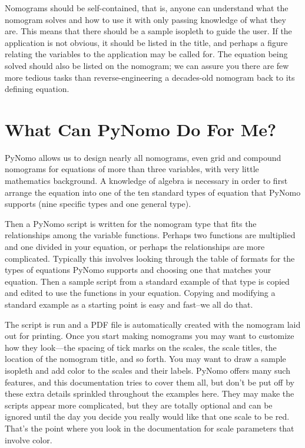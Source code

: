 \documentclass[a4paper,11pt,english]{sphinxmanual}
\begin{document}
Nomograms should be self-contained, that is, anyone can understand what the nomogram solves and how to use it with only passing knowledge of what they are. This means that there should be a sample isopleth to guide the user. If the application is not obvious, it should be listed in the title, and perhaps a figure relating the variables to the application may be called for. The equation being solved should also be listed on the nomogram; we can assure you there are few more tedious tasks than reverse-engineering a decades-old nomogram back to its defining equation.


\section{What Can PyNomo Do For Me?}
\label{introduction/introduction:what-can-pynomo-do-for-me}
PyNomo allows us to design nearly all nomograms, even grid and compound nomograms for equations of more than three variables, with very little mathematics background. A knowledge of algebra is necessary in order to first arrange the equation into one of the ten standard types of equation that PyNomo supports (nine specific types and one general type).

Then a PyNomo script is written for the nomogram type that fits the relationships among the variable functions. Perhaps two functions are multiplied and one divided in your equation, or perhaps the relationships are more complicated. Typically this involves looking through the table of formats for the types of equations PyNomo supports and choosing one that matches your equation. Then a sample script from a standard example of that type is copied and edited to use the functions in your equation. Copying and modifying a standard example as a starting point is easy and fast--we all do that.

The script is run and a PDF file is automatically created with the nomogram laid out for printing. Once you start making nomograms you may want to customize how they look—the spacing of tick marks on the scales, the scale titles, the location of the nomogram title, and so forth. You may want to draw a sample isopleth and add color to the scales and their labels. PyNomo offers many such features, and this documentation tries to cover them all, but don’t be put off by these extra details sprinkled throughout the examples here. They may make the scripts appear more complicated, but they are totally optional and can be ignored until the day you decide you really would like that one scale to be red. That’s the point where you look in the documentation for scale parameters that involve color.
\end{document}
